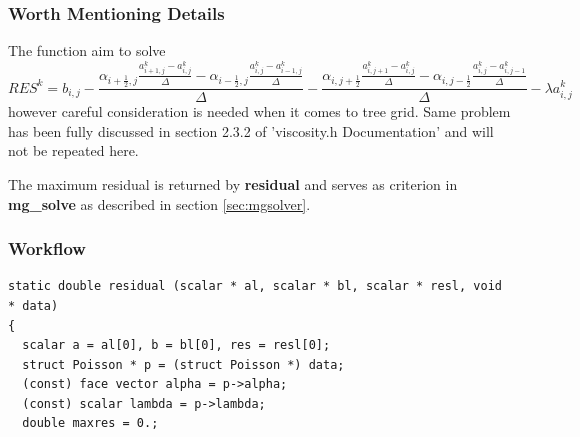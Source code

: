 \documentclass[a4paper]{article}
\newcommand{\func}[1]{\textbf{\textcolor{function}{#1}}}
\newcommand{\para}[1]{\textbf{\emph{\textcolor{para}{#1}}}}
\begin{document}
\subsubsection{Worth Mentioning Details}
The function aim to solve 
\begin{equation}\label{equ:res}
    RES^k=b_{i,j}-\frac{\alpha_{i+\frac{1}{2},j}\frac{a_{i+1,j}^k-a^k_{i,j}}{\Delta}-\alpha_{i-\frac{1}{2},j}\frac{a^k_{i,j}-a^k_{i-1,j}}{\Delta}}{\Delta}-\frac{\alpha_{i,j+\frac{1}{2}}\frac{a^k_{i,j+1}-a^k_{i,j}}{\Delta}-\alpha_{i,j-\frac{1}{2}}\frac{a^k_{i,j}-a^k_{i,j-1}}{\Delta}}{\Delta}-\lambda a^k_{i,j}
\end{equation}
however careful consideration is needed when it comes to tree grid. Same problem has been fully discussed in section 2.3.2 of 'viscosity.h Documentation' and will not be repeated here.\par
The maximum residual is returned by \func{residual} and serves as criterion in \func{mg\_solve} as described in section \ref{sec:mgsolver}.

\subsubsection{Workflow}
\begin{multicols}{2}
  \columnbreak
  \begin{verbatim}
static double residual (scalar * al, scalar * bl, scalar * resl, void * data)
{
  scalar a = al[0], b = bl[0], res = resl[0];
  struct Poisson * p = (struct Poisson *) data;
  (const) face vector alpha = p->alpha;
  (const) scalar lambda = p->lambda;
  double maxres = 0.;
  \end{verbatim}
\end{multicols}

\begin{center}
\end{center}
\end{document}
